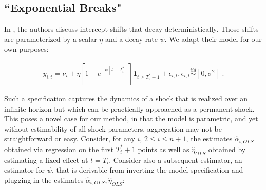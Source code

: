 \documentclass{uiucthesis2021}
\newcommand{\simiid}{\stackrel{iid}{\sim}} %
\theoremstyle{definition}
\begin{document}
  
  
  
  \subsection{``Exponential Breaks"}
  In \cite[][]{castle2011forecasting}, the authors discuss intercept shifts that decay deterministically.  Those shifts are parameterized by a scalar $\eta$ and a decay rate $\psi$.  We adapt their model for our own purposes:
  
  \begin{align}
  y_{i,t} = \nu_{i} + \eta[1 - e^{-\psi[t-T_{i}^{*}]}]\textbf{1}_{t\geq T_{i}^{*}+1} + \epsilon_{i,t}, \epsilon_{i,t} \simiid [0,\sigma^{2}] \text{ .}\label{decay_model}
  \end{align}
  
  Such a specification captures the dynamics of a shock that is realized over an infinite horizon but which can be practically approached as a permanent shock.  This poses a novel case for our method, in that the model is parametric, and yet without estimability of all shock parameters, aggregation may not be straightforward or easy.  Consider, for any $i$, $2 \leq i \leq n+1$, the estimates $\hat\alpha_{i,OLS}$  obtained via regression on the first $T_{i}^{*}+1$ points as well as $\hat\eta_{OLS}$ obtained by estimating a fixed effect at $t=T_{i}$.  Consider also a subsequent estimator, an estimator for $\psi$, that is derivable from inverting the model specification and plugging in the estimates  $\hat\alpha_{i,OLS},\hat\eta_{OLS}$:
  
\end{document}
